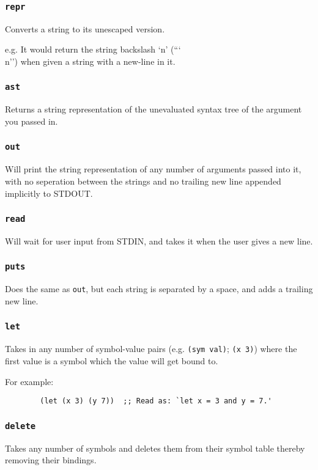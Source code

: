 \documentclass{article}
\newcommand{\code}[1]{\texttt{#1}}
\begin{document}
    \subsubsection{\code{repr}}
      Converts a string to its unescaped version.

      e.g. It would return the string backslash `n' (``\char`\\n'') when
      given a string with a new-line in it.

    \subsubsection{\code{ast}}
      Returns a string representation of the unevaluated syntax tree
      of the argument you passed in.

    \subsubsection{\code{out}}
      Will print the string representation of any number of arguments
      passed into it, with no seperation between the strings and no
      trailing new line appended implicitly to STDOUT.

    \subsubsection{\code{read}}
      Will wait for user input from STDIN, and takes it when the user gives a
      new line.
    \subsubsection{\code{puts}}
      Does the same as \code{out}, but each string is separated by a space,
      and adds a trailing new line.

    \subsubsection{\code{let}}
      Takes in any number of symbol-value pairs (e.g. \code{(sym val)};
      \code{(x 3)}) where the first value is a symbol which the value will
      get bound to.

      For example:
      \begin{verbatim}
        (let (x 3) (y 7))  ;; Read as: `let x = 3 and y = 7.'
      \end{verbatim}

    \subsubsection{\code{delete}}
      Takes any number of symbols and deletes them from their
      symbol table thereby removing their bindings.
\end{document}
